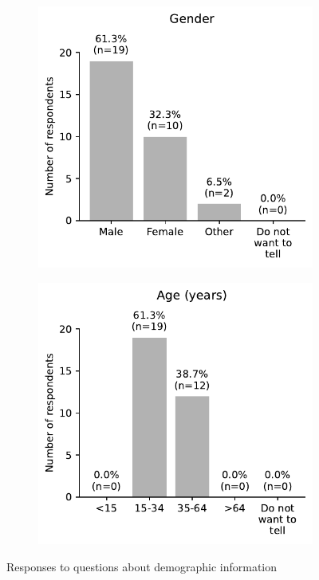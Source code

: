 \begin{appendices}
\begin{figure}[H]
	\centering
	\begin{subfigure}[b]{0.5\textwidth}
		\centering
		\includegraphics[width=\textwidth]{visual/figures/survey/13.pdf}
	\end{subfigure}%
	\hfill
	\begin{subfigure}[b]{0.5\textwidth}
		\centering
		\includegraphics[width=\textwidth]{visual/figures/survey/14.pdf}
	\end{subfigure}%
	\caption{Responses to questions about demographic information}
	\label{fig:demographic questions}
\end{figure}

\end{appendices}
